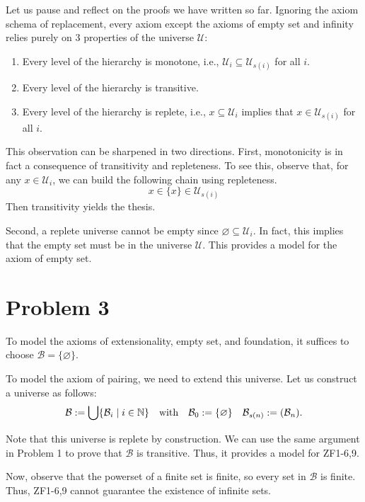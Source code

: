 \documentclass[a4paper]{article}
\newcommand{\N}{\mathbb{N}}
\let\P\relax
\newcommand{\P}{\mathcal{P}}
\newcommand{\U}{\mathcal{U}}
\newcommand{\B}{\mathcal{B}}
\begin{document}
\begin{remark}
  Let us pause and reflect on the proofs we have written so far.
  Ignoring the axiom schema of replacement, every axiom except the axioms of empty set and infinity relies purely on 3 properties of the universe $\U$:
  \begin{enumerate}
  \item Every level of the hierarchy is monotone, i.e., $\U_{i} \subseteq \U_{s(i)}$ for all $i$.
  \item Every level of the hierarchy is transitive.
  \item Every level of the hierarchy is replete, i.e., $x \subseteq \U_{i}$ implies that $x \in \U_{s(i)}$ for all $i$.
  \end{enumerate}
  This observation can be sharpened in two directions.
  First, monotonicity is in fact a consequence of transitivity and repleteness.
  To see this, observe that, for any $x \in \U_{i}$, we can build the following chain using repleteness.
  \[
    x \in \{x\} \in \U_{s(i)}
  \]
  Then transitivity yields the thesis.

  Second, a replete universe cannot be empty since $\varnothing \subseteq \U_{i}$.
  In fact, this implies that the empty set must be in the universe $\U$.
  This provides a model for the axiom of empty set.
\end{remark}

\section*{Problem 3}
To model the axioms of extensionality, empty set, and foundation, it suffices to choose $\B = \{\varnothing\}$.

To model the axiom of pairing, we need to extend this universe.
Let us construct a universe as follows:
\begin{align*}
  \B := \bigcup\{\B_{i} \mid i \in \N\} && \text{with} && \B_{0} := \{\varnothing\} && \B_{s(n)} := \P(\B_{n}).
\end{align*}

Note that this universe is replete by construction.
We can use the same argument in Problem 1 to prove that $\B$ is transitive.
Thus, it provides a model for ZF1-6,9.

Now, observe that the powerset of a finite set is finite, so every set in $\B$ is finite.
Thus, ZF1-6,9 cannot guarantee the existence of infinite sets.

\end{document}
